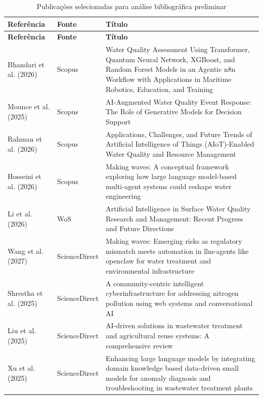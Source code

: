 \small
\setlength{\tabcolsep}{4pt}
\renewcommand{\arraystretch}{1.2}
\begin{longtable}{@{}>{\raggedright\arraybackslash}p{2.7cm}@{\hspace{0.25cm}}>{\raggedright\arraybackslash}p{2.5cm}@{\hspace{0.25cm}}>{\raggedright\arraybackslash}p{8.0cm}@{}}
\caption{Publicações selecionadas para análise bibliográfica preliminar} \label{tab:estudos-selecionados}\\
\hline
\textbf{Referência} & \textbf{Fonte} & \textbf{Título} \\
\hline
\endfirsthead
\hline
\textbf{Referência} & \textbf{Fonte} & \textbf{Título} \\
\hline
\endhead
Bhandari et al. (2026) & Scopus & Water Quality Assessment Using Transformer, Quantum Neural Network, XGBoost, and Random Forest Models in an Agentic n8n Workflow with Applications in Maritime Robotics, Education, and Training \\
Mounce et al. (2025) & Scopus & AI-Augmented Water Quality Event Response: The Role of Generative Models for Decision Support \\
Rahman et al. (2026) & Scopus & Applications, Challenges, and Future Trends of Artificial Intelligence of Things (AIoT)-Enabled Water Quality and Resource Management \\
Hosseini et al. (2026) & Scopus & Making waves: A conceptual framework exploring how large language model-based multi-agent systems could reshape water engineering \\
Li et al. (2026) & WoS & Artificial Intelligence in Surface Water Quality Research and Management: Recent Progress and Future Directions \\
Wang et al. (2027) & ScienceDirect & Making waves: Emerging risks as regulatory mismatch meets automation in llm-agents like openclaw for water treatment and environmental infrastructure \\
Shrestha et al. (2025) & ScienceDirect & A community-centric intelligent cyberinfrastructure for addressing nitrogen pollution using web systems and conversational AI \\
Liu et al. (2025) & ScienceDirect & AI-driven solutions in wastewater treatment and agricultural reuse systems: A comprehensive review \\
Xu et al. (2025) & ScienceDirect & Enhancing large language models by integrating domain knowledge based data-driven small models for anomaly diagnosis and troubleshooting in wastewater treatment plants \\

\end{longtable}
